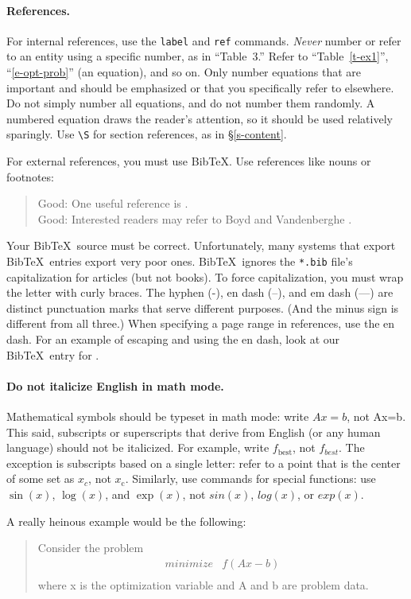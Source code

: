 \documentclass[12pt]{article}
\begin{document}
\paragraph{References.}
For internal references, use the \texttt{label} and \texttt{ref} commands.
\emph{Never} number or refer to an entity using a specific number,
as in ``Table~3.''
Refer to ``Table~\ref{t-ex1}'', ``\eqref{e-opt-prob}'' (an equation), and so on.
Only number equations that are important and should be emphasized or that you
specifically refer to elsewhere. Do not simply number all equations, and do not
number them randomly. A numbered equation draws the reader's attention, so it
should be used relatively sparingly. Use \verb|\S| for section references, as in
\S\ref{s-content}.

For external references, you must use Bib\TeX. Use references like nouns or 
footnotes:
\begin{quote}
Good: One useful reference is \cite{BoV:04}. \\
Good: Interested readers may refer to Boyd and Vandenberghe \cite{BoV:04}.
\end{quote}

Your Bib\TeX\ source must be correct.  Unfortunately, many systems that export
Bib\TeX\ entries export very poor ones.  Bib\TeX\ ignores the \texttt{*.bib}
file's capitalization for articles (but not books). To force capitalization,
you must wrap the letter with curly braces.  The hyphen (-), en dash (--), and
em dash (---) are distinct punctuation marks that serve different purposes.
(And the minus sign is different from all three.) When specifying a page range
in references, use the en dash. For an example of escaping and using the en
dash, look at our Bib\TeX\ entry for \cite{Tref:2008}.

\paragraph{Do not italicize English in math mode.}
Mathematical symbols should be typeset in math mode:
write $Ax=b$, not Ax=b. This said, subscripts or
superscripts that derive from English (or any human language) should not be
italicized. For example, write $f_\mathrm{best}$, not $f_{best}$. The exception
is subscripts based on a single letter: refer
to a point that is the center of some set as $x_c$, not $x_{\mathrm{c}}$.
Similarly, use commands for special functions: use $\sin(x)$,
$\log(x)$, and $\exp(x)$, not $sin(x)$, $log(x)$, or $exp(x)$.

A really heinous example would be the following:
\begin{quote}
Consider the problem
\[
\begin{array}{ll}
minimize & f(Ax - b) \\
\end{array}
\]
where x is the optimization variable and A and b are problem data.
\end{quote}
\end{document}
